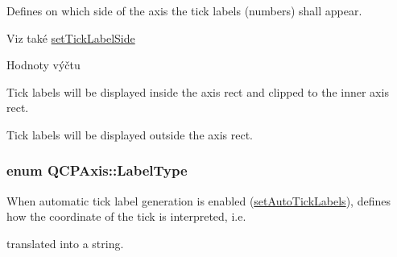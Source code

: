 Defines on which side of the axis the tick labels (numbers) shall appear. 

\begin{DoxySeeAlso}{Viz také}
\hyperlink{classQCPAxis_a13ec644fc6e22715744c92c6dfa4f0fa}{set\+Tick\+Label\+Side} 
\end{DoxySeeAlso}
\begin{Desc}
\item[Hodnoty výčtu]\par
\begin{description}
\item[{\em 
\hypertarget{classQCPAxis_a24b13374b9b8f75f47eed2ea78c37db9aae7b027ac2839cf4ad611df30236fc3f}{}ls\+Inside\label{classQCPAxis_a24b13374b9b8f75f47eed2ea78c37db9aae7b027ac2839cf4ad611df30236fc3f}
}]Tick labels will be displayed inside the axis rect and clipped to the inner axis rect. \item[{\em 
\hypertarget{classQCPAxis_a24b13374b9b8f75f47eed2ea78c37db9a2eadb509fc0c9a8b35b85c86ec9f3c7a}{}ls\+Outside\label{classQCPAxis_a24b13374b9b8f75f47eed2ea78c37db9a2eadb509fc0c9a8b35b85c86ec9f3c7a}
}]Tick labels will be displayed outside the axis rect. \end{description}
\end{Desc}
\hypertarget{classQCPAxis_a4a7da0166f755f5abac23b765d184cad}{}
\subsubsection[{Label\+Type}]{\setlength{\rightskip}{0pt plus 5cm}enum {\bf Q\+C\+P\+Axis\+::\+Label\+Type}}\label{classQCPAxis_a4a7da0166f755f5abac23b765d184cad}


When automatic tick label generation is enabled (\hyperlink{classQCPAxis_aaa47e3a6bac0c20d4beb9028f01bc1a1}{set\+Auto\+Tick\+Labels}), defines how the coordinate of the tick is interpreted, i.\+e. 

translated into a string.

